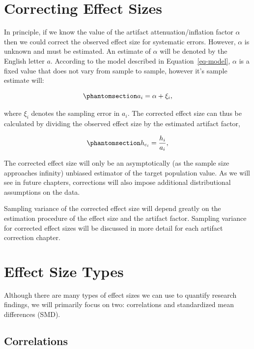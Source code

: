 \documentclass[
  letterpaper,
  DIV=11,
  numbers=noendperiod]{scrreprt}
\begin{document}
\section{Correcting Effect Sizes}\label{correcting-effect-sizes}

In principle, if we know the value of the artifact attenuation/inflation
factor \(\alpha\) then we could correct the observed effect size for
systematic errors. However, \(\alpha\) is unknown and must be estimated.
An estimate of \(\alpha\) will be denoted by the English letter \(a\).
According to the model described in Equation~\ref{eq-model}, \(\alpha\)
is a fixed value that does not vary from sample to sample, however it's
sample estimate will:

\begin{equation}\phantomsection\label{eq-a}{
a_i = \alpha + \xi_i,
}\end{equation}

where \(\xi_i\) denotes the sampling error in \(a_i\). The corrected
effect size can thus be calculated by dividing the observed effect size
by the estimated artifact factor,

\begin{equation}\phantomsection\label{eq-correction}{
h_{c_i} = \frac{h_i}{a_i},
}\end{equation}

The corrected effect size will only be an asymptotically (as the sample
size approaches infinity) unbiased estimator of the target population
value. As we will see in future chapters, corrections will also impose
additional distributional assumptions on the data.

Sampling variance of the corrected effect size will depend greatly on
the estimation procedure of the effect size and the artifact factor.
Sampling variance for corrected effect sizes will be discussed in more
detail for each artifact correction chapter.

\section{Effect Size Types}\label{effect-size-types}

Although there are many types of effect sizes we can use to quantify
research findings, we will primarily focus on two: correlations and
standardized mean differences (SMD).

\subsection{Correlations}\label{correlations}
\end{document}
